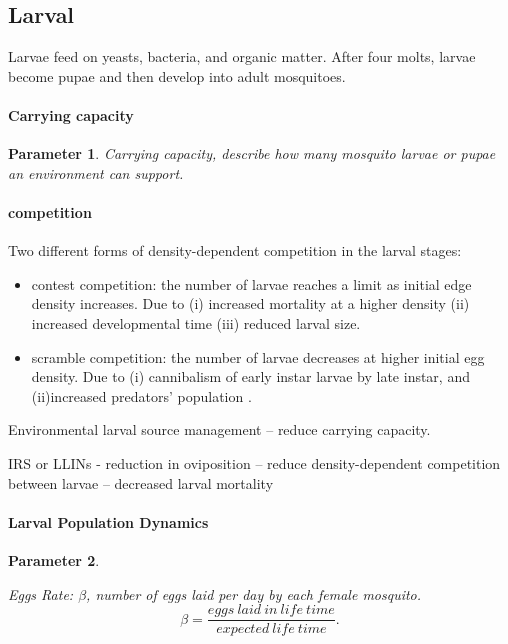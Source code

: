 \documentclass[a4paper, 12pt, twoside]{article}
\newtheorem{parameter}{Parameter}
\begin{document}
\subsection{Larval}

Larvae feed on yeasts, bacteria, and organic matter.
After four molts, larvae become pupae and then develop into adult mosquitoes.

\paragraph{Carrying capacity}%
\label{par:carrying_capacity}
\begin{parameter}
	Carrying capacity, describe how many mosquito larvae or pupae an environment can support.
\end{parameter}

\paragraph{competition}%
\label{par:competition}
Two different forms of density-dependent competition in the larval stages:

\begin{itemize}
	\item contest competition: the number of larvae reaches a limit as initial edge density increases. Due to (i) increased mortality at a higher density (ii) increased developmental time (iii) reduced larval size.
	\item scramble competition: the number of larvae decreases at higher initial egg density. Due to (i) cannibalism of early instar larvae by late instar, and (ii)increased predators' population .
\end{itemize}

Environmental larval source management -- reduce carrying capacity.

IRS or LLINs - reduction in oviposition -- reduce density-dependent competition between larvae -- decreased larval mortality

\paragraph{Larval Population Dynamics}%
\label{par:larval_population_dynamics}

\begin{parameter}
	\label{para:eggs_laid_per_day}

	Eggs Rate: $\beta$, number of eggs laid per day by each female mosquito.
	\[
		\beta=\frac{eggs\:laid\:in\:life\:time}{expected\:life\:time}
		.\]

\end{parameter}
\end{document}
